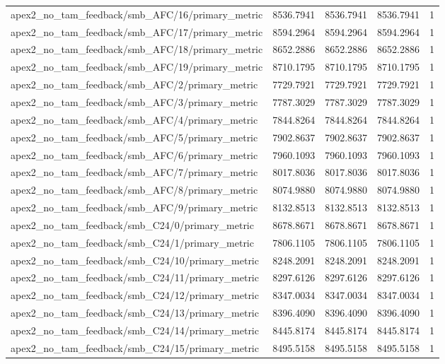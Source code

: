 \begin{table}[h]
\begin{tabular}{lrrrr}
apex2_no_tam_feedback/smb_AFC/16/primary_metric & 8536.7941 & 8536.7941 & 8536.7941 & 1 \\
apex2_no_tam_feedback/smb_AFC/17/primary_metric & 8594.2964 & 8594.2964 & 8594.2964 & 1 \\
apex2_no_tam_feedback/smb_AFC/18/primary_metric & 8652.2886 & 8652.2886 & 8652.2886 & 1 \\
apex2_no_tam_feedback/smb_AFC/19/primary_metric & 8710.1795 & 8710.1795 & 8710.1795 & 1 \\
apex2_no_tam_feedback/smb_AFC/2/primary_metric & 7729.7921 & 7729.7921 & 7729.7921 & 1 \\
apex2_no_tam_feedback/smb_AFC/3/primary_metric & 7787.3029 & 7787.3029 & 7787.3029 & 1 \\
apex2_no_tam_feedback/smb_AFC/4/primary_metric & 7844.8264 & 7844.8264 & 7844.8264 & 1 \\
apex2_no_tam_feedback/smb_AFC/5/primary_metric & 7902.8637 & 7902.8637 & 7902.8637 & 1 \\
apex2_no_tam_feedback/smb_AFC/6/primary_metric & 7960.1093 & 7960.1093 & 7960.1093 & 1 \\
apex2_no_tam_feedback/smb_AFC/7/primary_metric & 8017.8036 & 8017.8036 & 8017.8036 & 1 \\
apex2_no_tam_feedback/smb_AFC/8/primary_metric & 8074.9880 & 8074.9880 & 8074.9880 & 1 \\
apex2_no_tam_feedback/smb_AFC/9/primary_metric & 8132.8513 & 8132.8513 & 8132.8513 & 1 \\
apex2_no_tam_feedback/smb_C24/0/primary_metric & 8678.8671 & 8678.8671 & 8678.8671 & 1 \\
apex2_no_tam_feedback/smb_C24/1/primary_metric & 7806.1105 & 7806.1105 & 7806.1105 & 1 \\
apex2_no_tam_feedback/smb_C24/10/primary_metric & 8248.2091 & 8248.2091 & 8248.2091 & 1 \\
apex2_no_tam_feedback/smb_C24/11/primary_metric & 8297.6126 & 8297.6126 & 8297.6126 & 1 \\
apex2_no_tam_feedback/smb_C24/12/primary_metric & 8347.0034 & 8347.0034 & 8347.0034 & 1 \\
apex2_no_tam_feedback/smb_C24/13/primary_metric & 8396.4090 & 8396.4090 & 8396.4090 & 1 \\
apex2_no_tam_feedback/smb_C24/14/primary_metric & 8445.8174 & 8445.8174 & 8445.8174 & 1 \\
apex2_no_tam_feedback/smb_C24/15/primary_metric & 8495.5158 & 8495.5158 & 8495.5158 & 1 \\

\end{tabular}
\end{table}
